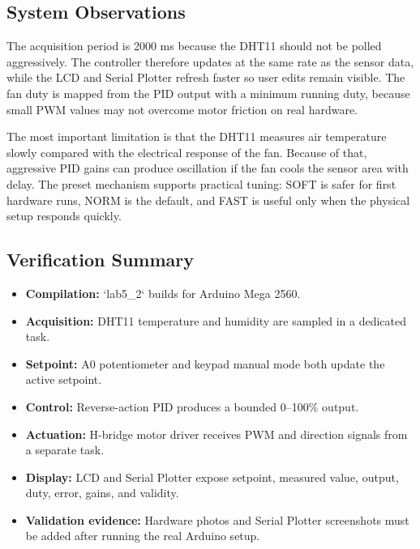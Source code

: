 \subsection{System Observations}

The acquisition period is 2000 ms because the DHT11 should not be polled aggressively. The controller therefore updates at the same rate as the sensor data, while the LCD and Serial Plotter refresh faster so user edits remain visible. The fan duty is mapped from the PID output with a minimum running duty, because small PWM values may not overcome motor friction on real hardware.

The most important limitation is that the DHT11 measures air temperature slowly compared with the electrical response of the fan. Because of that, aggressive PID gains can produce oscillation if the fan cools the sensor area with delay. The preset mechanism supports practical tuning: SOFT is safer for first hardware runs, NORM is the default, and FAST is useful only when the physical setup responds quickly.

\subsection{Verification Summary}

\begin{itemize}
    \item \textbf{Compilation:} `lab5\_2` builds for Arduino Mega 2560.
    \item \textbf{Acquisition:} DHT11 temperature and humidity are sampled in a dedicated task.
    \item \textbf{Setpoint:} A0 potentiometer and keypad manual mode both update the active setpoint.
    \item \textbf{Control:} Reverse-action PID produces a bounded 0--100\% output.
    \item \textbf{Actuation:} H-bridge motor driver receives PWM and direction signals from a separate task.
    \item \textbf{Display:} LCD and Serial Plotter expose setpoint, measured value, output, duty, error, gains, and validity.
    \item \textbf{Validation evidence:} Hardware photos and Serial Plotter screenshots must be added after running the real Arduino setup.
\end{itemize}

